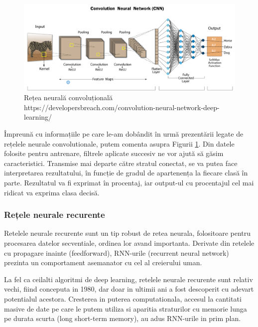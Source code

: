\documentclass[a4paper, 12pt]{report}
\begin{document}
	\clearpage
	\begin{figure}[h]
		\begin{center}
			\includegraphics[scale=0.29]{images/cnn.png}
		\end{center}
		\caption{Rețea neurală convoluțională\newline
			\hspace{\linewidth}https://developersbreach.com/convolution-neural-network-deep-learning/}
		\label{fig:cnn}
	\end{figure}
	
	Împreună cu informațiile pe care le-am dobândit în urmă prezentării legate de rețelele neurale convolutionale, putem comenta asupra Figurii \ref{fig:cnn}. Din datele folosite pentru antrenare, filtrele aplicate succesiv ne vor ajută să găsim caracteristici. Transmise mai departe către stratul conectat, se va putea face interpretarea rezultatului, în funcție de gradul de apartenența la fiecare clasă în parte. Rezultatul va fi exprimat în procentaj, iar output-ul cu procentajul cel mai ridicat va exprima clasa decisă.
	\clearpage
	\subsubsection{Rețele neurale recurente}
	Retelele neurale recurente sunt un tip robust de retea neurala, folositoare pentru procesarea datelor secventiale, ordinea lor avand importanta. Derivate din retelele cu propagare inainte (feedforward), RNN-urile (recurrent neural network) prezinta un comportament asemanator cu cel al creierului uman.
	
	La fel ca ceilalti algoritmi de deep learning, retelele neurale recurente sunt relativ vechi, fiind conceputa in 1980, dar doar in ultimii ani a fost descoperit cu adevart potentialul acestora. Cresterea in puterea computationala, accesul la cantitati masive de date pe care le putem utiliza si aparitia straturilor cu memorie lunga pe durata scurta (long short-term memory), au adus RNN-urile in prim plan.
	
\end{document}
